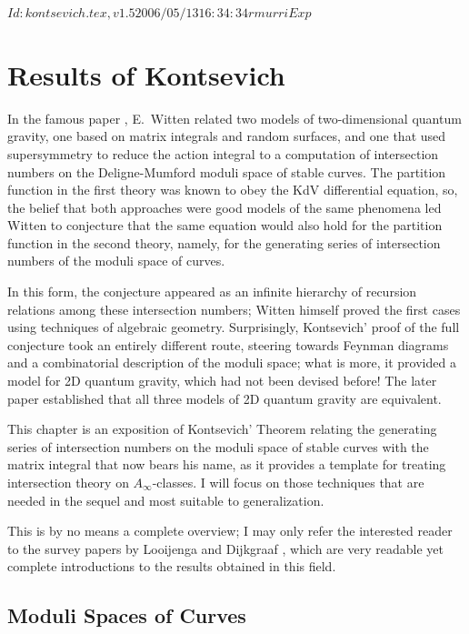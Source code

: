 \RCSID $Id: kontsevich.tex,v 1.5 2006/05/13 16:34:34 rmurri Exp $


\chapter{Results of Kontsevich}
\label{cha:kontsevich}


In the famous paper \cite{witten;intersection-theory}, E.~Witten
related two models of two-dimensional quantum gravity, one based on
matrix integrals and random surfaces, and one that used supersymmetry
to reduce the action integral to a computation of intersection numbers
on the Deligne-Mumford moduli space of stable curves. The partition
function in the first theory was known to obey the KdV differential
equation, so, the belief that both approaches were good models of the
same phenomena led Witten to conjecture that the same equation would
also hold for the partition function in the second theory, namely, for
the generating series of intersection numbers of the moduli space of
curves.

In this form, the conjecture appeared as an infinite hierarchy of
recursion relations among these intersection numbers; Witten himself
proved the first cases using techniques of algebraic geometry.
Surprisingly, Kontsevich' proof of the full conjecture took an
entirely different route, steering towards Feynman diagrams and a
combinatorial description of the moduli space; what is more, it
provided a model for 2D quantum gravity, which had not been devised
before!  The later paper \cite{witten;kontsevich-model} established
that all three models of 2D quantum gravity are equivalent.

This chapter is an exposition of Kontsevich' Theorem relating the
generating series of intersection numbers on the moduli space of
stable curves with the matrix integral that now bears his name, as it
provides a template for treating intersection theory on $A_\infty$-classes.
I will focus on those techniques that are needed in the sequel and
most suitable to generalization.

This is by no means a complete overview; I may only refer the
interested reader to the survey papers by Looijenga
\cite{looijenga;intersection-theory} and Dijkgraaf
\cite{dijkgraaf;intersection-theory}, which are very readable yet
complete introductions to the results obtained in this field.


\section{Moduli Spaces of Curves}
\label{sec:moduli-spaces}

